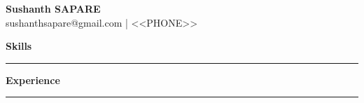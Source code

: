 \documentclass[11pt,a4paper]{article}
\begin{document}
\begin{center}
    {\Huge \textbf{Sushanth SAPARE}} \\
    \vspace{2mm}
    sushanthsapare@gmail.com | <<PHONE>>
\end{center}

\vspace{5mm}
\noindent\textbf{\Large Skills} \\
\rule{\textwidth}{0.4pt}
\begin{itemize}
\end{itemize}

\vspace{5mm}
\noindent\textbf{\Large Experience} \\
\rule{\textwidth}{0.4pt}
\end{document}
